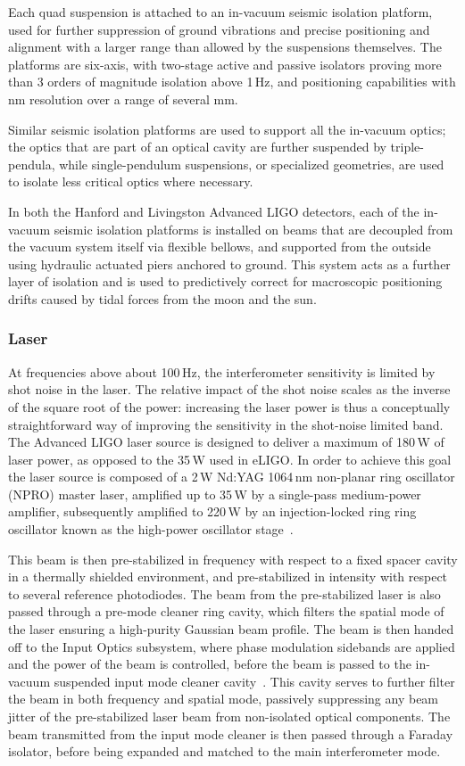 Each quad suspension is attached to an in-vacuum seismic isolation platform, 
used for further suppression of ground vibrations and precise positioning and 
alignment with a larger range than allowed by the suspensions themselves. The 
platforms are six-axis, with two-stage active and passive isolators proving more 
than 3 orders of magnitude isolation above 1\,Hz, and positioning capabilities 
with nm resolution over a range of several mm.

Similar seismic isolation platforms are used to support all the in-vacuum optics; 
the optics that are part of an optical cavity are further suspended by triple-pendula, while 
single-pendulum suspensions, or specialized geometries, are used to isolate 
less critical optics where necessary.

In both the Hanford and Livingston Advanced LIGO detectors, 
each of the in-vacuum seismic isolation platforms is 
installed on beams that are decoupled from the vacuum system itself via 
flexible bellows, and supported from the outside using hydraulic actuated 
piers anchored to ground.
This system acts as a further layer of isolation and is used to predictively correct for macroscopic positioning drifts caused by tidal forces from the moon and the sun.

\subsubsection{Laser}
At frequencies above about 100\,Hz, the interferometer sensitivity is limited by shot 
noise in the laser. The relative impact of the shot noise scales as the inverse of the 
square root of the power: increasing the laser power is thus a conceptually 
straightforward way of improving the sensitivity in the shot-noise limited band. 
The Advanced LIGO laser source is designed to deliver a maximum of 180\,W of laser power, as opposed to the 35\,W used in eLIGO.
In order to achieve this goal the laser source is composed of a 2\,W Nd:YAG 1064\,nm non-planar ring oscillator (NPRO) master laser, amplified up to 35\,W by a single-pass medium-power amplifier, subsequently amplified to 220\,W by an injection-locked ring ring oscillator known as the high-power oscillator stage~\cite{Kwee_2012}. 

This beam is then pre-stabilized in frequency with respect to a fixed spacer cavity in a thermally shielded environment, and pre-stabilized in intensity with respect to several reference photodiodes. 
The beam from the pre-stabilized laser is also passed through a pre-mode cleaner ring cavity, which filters the spatial mode of the laser ensuring a high-purity Gaussian beam profile. 
The beam is then handed off to the Input Optics subsystem, where phase modulation sidebands are applied and the power of the beam is controlled, before the beam is passed to the in-vacuum suspended input mode cleaner cavity~\cite{Mueller_2016}. 
This cavity serves to further filter the beam in both frequency and spatial mode, passively suppressing any beam jitter of the pre-stabilized laser beam from non-isolated optical components. 
The beam transmitted from the input mode cleaner is then passed through a Faraday isolator, before being expanded and matched to the 
main interferometer mode.

